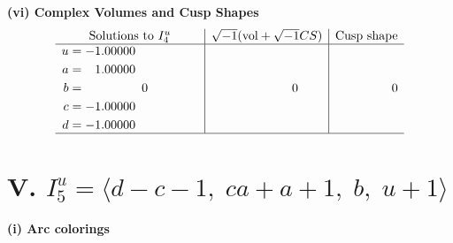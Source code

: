 \documentclass[1p]{elsarticle_modified}
\theoremstyle{definition}
\newcommand{\I}{\sqrt{-1}}
\begin{document}
\newpage\flushleft \textbf{(vi) Complex Volumes and Cusp Shapes}
$$\begin{array}{c|c|c}  
\text{Solutions to }I^u_{4}& \I (\text{vol} + \sqrt{-1}CS) & \text{Cusp shape}\\
 \hline 
\begin{aligned}
u &= -1.00000\phantom{ +0.000000I} \\
a &= \phantom{-}1.00000\phantom{ +0.000000I} \\
b &= \phantom{-0.000000 } 0 \\
c &= -1.00000\phantom{ +0.000000I} \\
d &= -1.00000\phantom{ +0.000000I}\end{aligned}
 & \phantom{-0.000000 } 0 & \phantom{-0.000000 } 0\\
 \hline 
 \end{array}$$\newpage\newpage\renewcommand{\arraystretch}{1}
\centering \section*{V. $I^u_{5}= \langle d- c-1,\;c a+a+1,\;b,\;u+1 \rangle$}
\flushleft \textbf{(i) Arc colorings}\\
\end{document}
